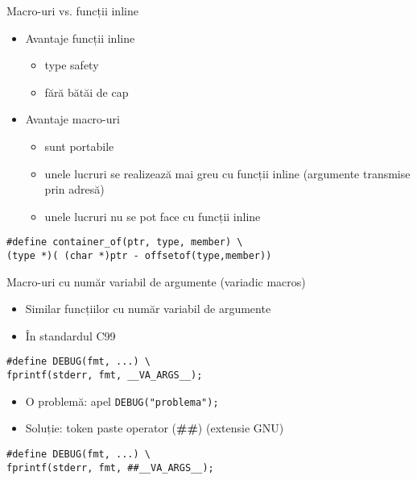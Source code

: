 \documentclass{beamer}
\begin{document}
\begin{frame}{Macro-uri vs. funcții inline}
	\begin{itemize}
		\item Avantaje funcții inline
			\begin{itemize}
				\item type safety
				\item fără bătăi de cap
			\end{itemize}
		\item Avantaje macro-uri
			\begin{itemize}
				\item sunt portabile
				\item unele lucruri se realizează mai greu cu funcții inline
	(argumente transmise prin adresă)
				\item unele lucruri nu se pot face cu funcții inline
			\end{itemize}
	\end{itemize}

	\begin{beamerboxesrounded}[lower=block body,shadow=true]{}
		\texttt{\#define container\_of(ptr, type, member) \textbackslash{} \\
\hlstd{}\hlstd{\ \ \ \ }\hlstd{}(type *)( (char *)ptr -
offsetof(type,member))
		}
	\end{beamerboxesrounded}

\end{frame}

\begin{frame}{Macro-uri cu număr variabil de argumente (variadic macros)}
	\begin{itemize}
		\item Similar funcțiilor cu număr variabil de argumente
		\item În standardul C99
	\end{itemize}

	\begin{beamerboxesrounded}[lower=block body,shadow=true]{}
\texttt{\#define DEBUG(fmt, ...) \textbackslash{} \\
\hlstd{}\hlstd{\ \ \ \ \ \ \ \ }\hlstd{}fprintf(stderr, fmt, \_\_VA\_ARGS\_\_);}
	\end{beamerboxesrounded}

	\begin{itemize}
		\item O problemă: apel \texttt{DEBUG("problema");}
		\item Soluție: token paste operator (\textbf{\#\#}) (extensie GNU)
	\end{itemize}

	\begin{beamerboxesrounded}[lower=block body,shadow=true]{}
\texttt{\#define DEBUG(fmt, ...) \textbackslash{} \\
\hlstd{}\hlstd{\ \ \ \ \ \ \ \ }\hlstd{}fprintf(stderr, fmt, \#\#\_\_VA\_ARGS\_\_);}
	\end{beamerboxesrounded}
\end{frame}
\end{document}
